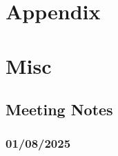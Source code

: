 \documentclass{article}
\begin{document}







\section*{Appendix}

\section{Misc}

\subsection{Meeting Notes}

\subsubsection{01/08/2025}    
\end{document}
